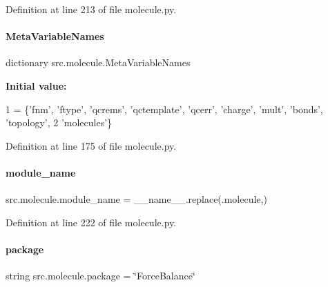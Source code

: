 Definition at line 213 of file molecule.\+py.

\mbox{\label{namespacesrc_1_1molecule_a4c6798b828fd919cc79a5d8193e8928a}} 
\paragraph{\texorpdfstring{Meta\+Variable\+Names}{MetaVariableNames}}
{\footnotesize\ttfamily dictionary src.\+molecule.\+Meta\+Variable\+Names}

{\bfseries Initial value\+:}
\begin{DoxyCode}
1 =  \{\textcolor{stringliteral}{'fnm'}, \textcolor{stringliteral}{'ftype'}, \textcolor{stringliteral}{'qcrems'}, \textcolor{stringliteral}{'qctemplate'}, \textcolor{stringliteral}{'qcerr'}, \textcolor{stringliteral}{'charge'}, \textcolor{stringliteral}{'mult'}, \textcolor{stringliteral}{'bonds'}, \textcolor{stringliteral}{'topology'},
2                      \textcolor{stringliteral}{'molecules'}\}
\end{DoxyCode}


Definition at line 175 of file molecule.\+py.

\mbox{\label{namespacesrc_1_1molecule_ad5301fb2ee3b4c9aa0be3dba89f2d30e}} 
\paragraph{\texorpdfstring{module\+\_\+name}{module\_name}}
{\footnotesize\ttfamily src.\+molecule.\+module\+\_\+name = \+\_\+\+\_\+name\+\_\+\+\_\+.\+replace(\textquotesingle{}.molecule\textquotesingle{},\textquotesingle{}\textquotesingle{})}



Definition at line 222 of file molecule.\+py.

\mbox{\label{namespacesrc_1_1molecule_a9af903d1a1ea8401cdc4c872a088ce48}} 
\paragraph{\texorpdfstring{package}{package}}
{\footnotesize\ttfamily string src.\+molecule.\+package = \char`\"{}Force\+Balance\char`\"{}}




